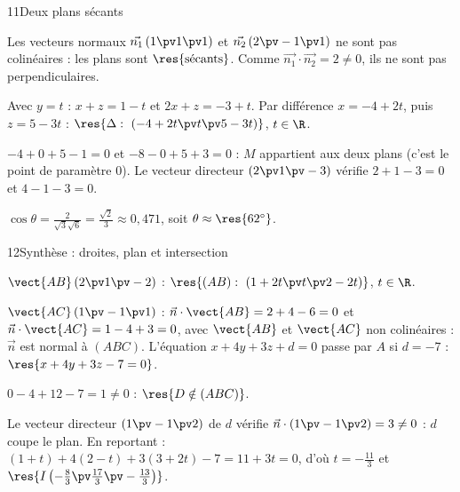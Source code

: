 \begin{deuxcolonnes}
\end{deuxcolonnes}

\corrigesSouples
\begin{corrige}{11}{Deux plans sécants}
\begin{questions}
  \item Les vecteurs normaux $\vec{n_1}\,(1\pv1\pv1)$ et $\vec{n_2}\,(2\pv-1\pv1)$ ne sont pas colinéaires : les plans sont
    $\res{\text{sécants}}$. Comme $\vec{n_1}\cdot\vec{n_2}=2\neq0$, ils ne sont pas perpendiculaires.
  \item Avec $y=t$ : $x+z=1-t$ et $2x+z=-3+t$. Par différence $x=-4+2t$, puis $z=5-3t$ :
    $\res{\Delta:\ (-4+2t\pv t\pv5-3t)}$, $t\in\R$.
  \item $-4+0+5-1=0$ et $-8-0+5+3=0$ : $M$ appartient aux deux plans (c'est le point de paramètre $0$). Le vecteur directeur
    $(2\pv1\pv-3)$ vérifie $2+1-3=0$ et $4-1-3=0$.
  \item $\cos\theta=\frac{2}{\sqrt3\sqrt6}=\frac{\sqrt2}{3}\approx0{,}471$, soit $\theta\approx\res{62^\circ}$.
\end{questions}
\end{corrige}

\begin{corrige}{12}{Synthèse : droites, plan et intersection}
\begin{questions}
  \item $\vect{AB}\,(2\pv1\pv-2)$ : $\res{(AB):\ (1+2t\pv t\pv2-2t)}$, $t\in\R$.
  \item $\vect{AC}\,(1\pv-1\pv1)$ : $\vec n\cdot\vect{AB}=2+4-6=0$ et $\vec n\cdot\vect{AC}=1-4+3=0$, avec $\vect{AB}$ et $\vect{AC}$ non
    colinéaires : $\vec n$ est normal à $(ABC)$. L'équation $x+4y+3z+d=0$ passe par $A$ si $d=-7$ : $\res{x+4y+3z-7=0}$.
  \item $0-4+12-7=1\neq0$ : $\res{D\notin(ABC)}$.
  \item Le vecteur directeur $(1\pv-1\pv2)$ de $d$ vérifie $\vec n\cdot(1\pv-1\pv2)=3\neq0$ : $d$ coupe le plan. En reportant :
    $(1+t)+4(2-t)+3(3+2t)-7=11+3t=0$, d'où $t=-\frac{11}3$ et $\res{I\left(-\tfrac83\pv\tfrac{17}{3}\pv-\tfrac{13}{3}\right)}$.
\end{questions}
\end{corrige}

